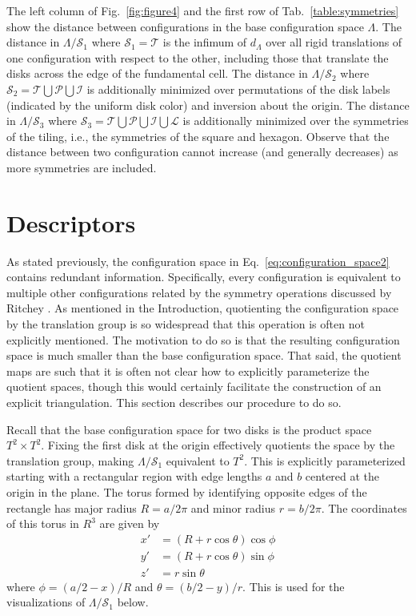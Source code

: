 \documentclass[default,iicol]{sn-jnl}%
\theoremstyle{thmstyleone}%
\theoremstyle{thmstyletwo}%
\theoremstyle{thmstylethree}%
\begin{document}
The left column of Fig.\ \ref{fig:figure4} and the first row of Tab.\ \ref{table:symmetries} show the distance between configurations in the base configuration space $\Lambda$. The distance in $\Lambda/\mathcal{S}_1$ where $\mathcal{S}_1 = \mathcal{T}$ is the infimum of $d_\Lambda$ over all rigid translations of one configuration with respect to the other, including those that translate the disks across the edge of the fundamental cell. The distance in $\Lambda/\mathcal{S}_2$ where $\mathcal{S}_2 = \mathcal{T} \bigcup \mathcal{P} \bigcup \mathcal{I}$ is additionally minimized over permutations of the disk labels (indicated by the uniform disk color) and inversion about the origin. The distance in $\Lambda/\mathcal{S}_3$ where $\mathcal{S}_3 = \mathcal{T} \bigcup \mathcal{P} \bigcup \mathcal{I} \bigcup \mathcal{L}$ is additionally minimized over the symmetries of the tiling, i.e., the symmetries of the square and hexagon. Observe that the distance between two configuration cannot increase (and generally decreases) as more symmetries are included.



\section{Descriptors}
\label{sec:descriptors}

As stated previously, the configuration space in Eq.\ \ref{eq:configuration_space2} contains redundant information. Specifically, every configuration is equivalent to multiple other configurations related by the symmetry operations discussed by Ritchey \cite{ritcheyphd}. As mentioned in the Introduction, quotienting the configuration space by the translation group is so widespread that this operation is often not explicitly mentioned. The motivation to do so is that the resulting configuration space is much smaller than the base configuration space. That said, the quotient maps are such that it is often not clear how to explicitly parameterize the quotient spaces, though this would certainly facilitate the construction of an explicit triangulation. This section describes our procedure to do so.

Recall that the base configuration space for two disks is the product space $T^2 \times T^2$. Fixing the first disk at the origin effectively quotients the space by the translation group, making $\Lambda/\mathcal{S}_1$ equivalent to $T^2$. This is explicitly parameterized starting with a rectangular region with edge lengths $a$ and $b$ centered at the origin in the plane. The torus formed by identifying opposite edges of the rectangle has major radius $R = a / 2 \pi$ and minor radius $r = b / 2 \pi$. The coordinates of this torus in $R^3$ are given by
\begin{align*}
	x' &=  (R + r \cos\theta) \cos\phi \nonumber \\
	y' &= (R + r \cos\theta) \sin\phi \nonumber \\
	z' &= r \sin\theta  \label{eq:torus_mapping}
\end{align*}
where $\phi = (a / 2 - x) / R$ and $\theta = (b / 2 - y) / r$. This is used for the visualizations of $\Lambda/\mathcal{S}_1$ below.
\end{document}
